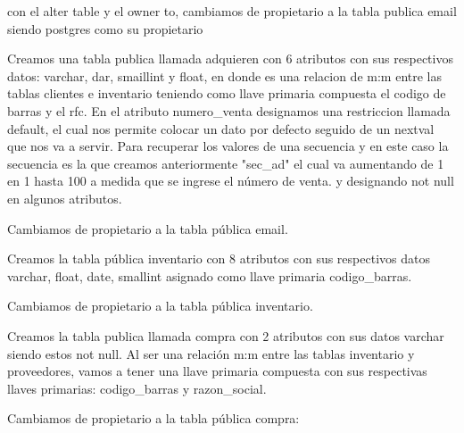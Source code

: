 \documentclass[letterpaper,12pt]{article}
\begin{document}
	con el alter table y el owner to, cambiamos de propietario a la tabla publica email siendo postgres como su propietario
	
	
	
	Creamos una tabla publica llamada adquieren con 6 atributos con sus respectivos datos: varchar, dar, smaillint y float, en donde es una relacion de m:m entre las tablas clientes e inventario teniendo como llave primaria compuesta el codigo de barras y el rfc.
	En el atributo numero\_venta designamos una restriccion llamada default, el cual nos permite colocar un dato por defecto seguido de un nextval que nos va a servir.
	Para recuperar los valores de una secuencia y en este caso la secuencia es la que creamos anteriormente "sec\_ad" el cual va aumentando de 1 en 1 hasta 100 a medida que se ingrese el número de venta.
	y designando not null en algunos atributos.
	
	
	
	Cambiamos de propietario a la tabla pública email.
	
	
	
	Creamos la tabla pública inventario con 8 atributos con sus respectivos datos varchar, float, date, smallint asignado como llave primaria codigo\_barras.
	
	
	
	Cambiamos de propietario a la tabla pública inventario.
	
	
	
	Creamos la tabla publica llamada compra con 2 atributos con sus datos varchar siendo estos not null.
	Al ser una relación m:m entre las tablas inventario y proveedores, vamos a tener una llave primaria compuesta con sus respectivas llaves primarias: codigo\_barras y razon\_social.
	
	
	
	Cambiamos de propietario a la tabla pública compra:
	
\end{document}
